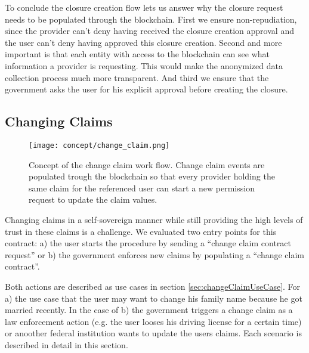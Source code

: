 To conclude the closure creation flow lets us answer why the closure request needs to be populated through the blockchain. First we ensure non-repudiation, since the provider can't deny having received the closure creation approval and the user can't deny having approved this closure creation. Second and more important is that each entity with access to the blockchain can see what information a provider is requesting. This would make the anonymized data collection process much more transparent. And third we ensure that the government asks the user for his explicit approval before creating the closure. 

\subsection{Changing Claims}

\begin{figure}
 \texttt{[image: concept/change\_claim.png]}
 \centering
\caption{Concept of the change claim work flow. Change claim events are populated trough the blockchain so that every provider holding the same claim for the referenced user can start a new permission request to update the claim values.}
\label{fig:changeClaimsFig}
\end{figure}

Changing claims in a self-sovereign manner while still providing the high levels of trust in these claims is a challenge. We evaluated two entry points for this contract: a) the user starts the procedure by sending a “change claim contract request” or b) the government enforces new claims by populating a “change claim contract”. 

Both actions are described as use cases in section \ref{sec:changeClaimUseCase}. For a) the use case that the user may want to change his family name because he got married recently. In the case of b) the government triggers a change claim as a law enforcement action (e.g. the user looses his driving license for a certain time) or anoother federal institution wants to update the users claims. Each scenario is described in detail in this section. 

